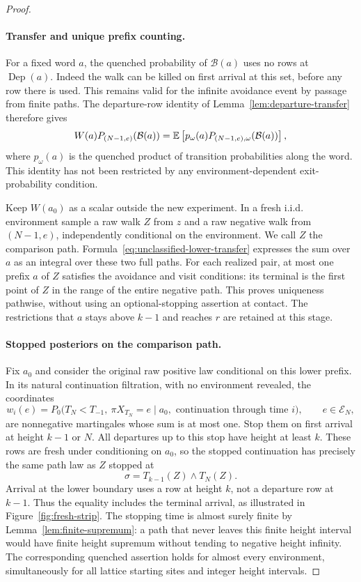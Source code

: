 \begin{proof}
\paragraph{Transfer and unique prefix counting.}
For a fixed word $a$, the quenched probability of $\mathcal B(a)$ uses
no rows at $\operatorname{Dep}(a)$.  Indeed the walk can be killed on
first arrival at this set, before any row there is used.  This remains
valid for the infinite avoidance event by passage from finite paths.
The departure-row identity of Lemma~\ref{lem:departure-transfer} therefore
gives
\begin{equation}\label{eq:unclassified-lower-transfer}
 W(a)P_{(N-1,e)}(\mathcal B(a))
 =\mathbb E\left[p_\omega(a)
       P_{(N-1,e),\omega}(\mathcal B(a))\right],
\end{equation}
where $p_\omega(a)$ is the quenched product of transition probabilities
along the word.  This identity has not been restricted by any
environment-dependent exit-probability condition.

Keep $W(a_0)$ as a scalar outside the new experiment.  In a fresh
i.i.d. environment sample a raw walk $Z$ from $z$ and a raw negative
walk from $(N-1,e)$, independently conditional on the environment.  We
call $Z$ the comparison path.  Formula~\eqref{eq:unclassified-lower-transfer}
expresses the sum over $a$ as an integral over these two full paths.
For each realized pair, at most one prefix $a$ of $Z$ satisfies the
avoidance and visit conditions: its terminal is the first point of $Z$
in the range of the entire negative path.  This proves uniqueness
pathwise, without using an optional-stopping assertion at contact.
The restrictions that $a$ stays above $k-1$ and reaches $r$ are retained
at this stage.

\paragraph{Stopped posteriors on the comparison path.}
Fix $a_0$ and consider the original raw positive law conditional on this
lower prefix.  In its natural continuation filtration, with no
environment revealed, the coordinates
\[
 w_i(e)=P_0\bigl(T_N<T_{-1},\ \pi X_{T_N}=e
             \mid a_0,\text{ continuation through time }i\bigr),
 \qquad e\in\mathcal E_N,
\]
are nonnegative martingales whose sum is at most one.  Stop them on
first arrival at height $k-1$ or $N$.  All departures up to this stop
have height at least $k$.  These rows are fresh under conditioning on
$a_0$, so the stopped continuation has precisely the same path law as
$Z$ stopped at
\[
 \sigma=T_{k-1}(Z)\wedge T_N(Z).
\]
Arrival at the lower boundary uses a row at height $k$, not a departure
row at $k-1$.  Thus the equality includes the terminal arrival, as
illustrated in Figure~\ref{fig:fresh-strip}.  The stopping time is
almost surely finite by
Lemma~\ref{lem:finite-supremum}: a path that never leaves this finite
height interval would have finite height supremum without tending to
negative height infinity.  The corresponding quenched assertion holds
for almost every environment, simultaneously for all lattice starting
sites and integer height intervals.


\end{proof}
